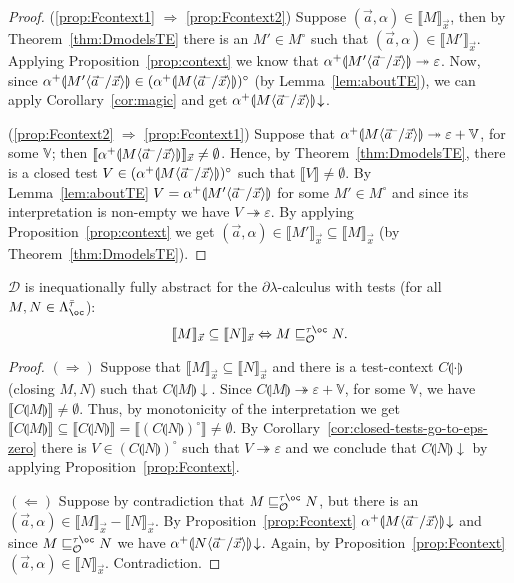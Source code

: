 \documentclass{LMCS}
\newcommand{\bool}{\mathbf{2}}
\newcommand{\dlam}{\ensuremath{\partial\lambda}}
\newcommand{\bang}{\oc}
\renewcommand{\hole}[1]{\llparenthesis #1\rrparenthesis}
\newcommand{\FSet}[1]{\Lambda^{#1}_{\bang}}
\newcommand{\msto}{\twoheadrightarrow}
\newcommand{\Fobsle}{\sqsubseteq^{\gt\bang}_{\mathcal{O}}}
\newcommand{\TE}[1]{#1^{\circ}} \newcommand{\at}{\!::\!}
\newcommand{\Int}[1]{\llbracket #1\rrbracket} \newcommand{\trm}[1]{#1^{\textrm{--}}}
\newcommand{\cont}[2]{#1^{+}\hole{#2}}
\renewcommand{\iff}{\Leftrightarrow}
\newcommand{\seq}[1]{\vec{#1}}
\newcommand{\imp}{\Rightarrow}
\newcommand{\sV}{\mathbb{V}}
\newcommand{\ga}{\alpha}
\newcommand{\gt}{\ensuremath{\tau}}
\newcommand{\gto}{\ensuremath{\bar\tau}}
\newcommand{\cD}{\mathcal{D}}
\newcommand{\cOnv}[1]{#1\!\downarrow} \renewcommand{\div}[1]{#1\!\uparrow} \newcommand{\module}[1]{\bool\langle #1 \rangle}
\begin{document}
\begin{proof}
(\ref{prop:Fcontext1} $\imp$ \ref{prop:Fcontext2})
Suppose $(\seq a,\alpha)\in\Int{M}_{\seq x}$, then by Theorem~\ref{thm:DmodelsTE} 
there is an $M'\in\TE{M}$ such that $(\seq a,\alpha)\in\Int{M'}_{\seq x}$.
Applying Proposition~\ref{prop:context} we know that $\cont{\alpha}{M'\lsubst{\seq x}{\trm{\seq{a}}}}\msto\varepsilon$.
Now, since $\cont{\alpha}{M'\lsubst{\seq x}{\trm{\seq{a}}}}\in\TE{(\cont{\alpha}{M\lsubst{\seq x}{\trm{\seq{a}}}})}$ (by Lemma~\ref{lem:aboutTE}),
we can apply Corollary~\ref{cor:magic} and get $\cOnv{\cont{\alpha}{M\lsubst{\seq x}{\trm{\seq{a}}}}}$.

(\ref{prop:Fcontext2} $\imp$ \ref{prop:Fcontext1}) 
Suppose that $\cont{\alpha}{M\lsubst{\seq{x}}{\trm{\seq{a}}}} \msto \varepsilon + \sV$, for some $\sV$; 
then $\Int{\cont{\alpha}{M\lsubst{\seq{x}}{\trm{\seq{a}}}}}_{\seq x}\neq\emptyset$.
Hence, by Theorem~\ref{thm:DmodelsTE}, there is a closed test $V\in\TE{(\cont{\alpha}{M\lsubst{\seq{x}}{\trm{\seq{a}}}})}$ 
such that $\Int{V}\neq\emptyset$.
By Lemma~\ref{lem:aboutTE} $V = \cont{\alpha}{M'\lsubst{\seq x}{\trm{\seq{a}}}}$ for some $M'\in\TE{M}$ and
since its interpretation is non-empty we have $V\msto\varepsilon$.
By applying Proposition~\ref{prop:context} we get $(\seq a,\alpha)\in\Int{M'}_{\seq x}\subseteq\Int{M}_{\seq x}$ 
(by Theorem~\ref{thm:DmodelsTE}).
\end{proof}

\begin{thm}\label{thm:main2} 
$\cD$ is inequationally fully abstract for the \dlam-calculus with tests (for all $M,N\in\FSet{\gto}$):
$$
\Int{M}_{\seq x}\subseteq \Int{N}_{\seq x} \iff M\Fobsle N.
$$
\end{thm}

\begin{proof} $(\imp)$ Suppose that $\Int{M}_{\seq x}\subseteq\Int{N}_{\seq x}$ 
and there is a test-context $C\hole{\cdot}$ (closing $M,N$) such that $\cOnv{C\hole{M}}$.
Since $C\hole{M}\msto\varepsilon + \sV$, for some $\sV$, we have $\Int{C\hole{M}}\neq\emptyset$.
Thus, by monotonicity of the interpretation we get 
$\Int{C\hole{M}}\subseteq\Int{C\hole{N}} = \Int{\TE{(C\hole{N})}}\neq\emptyset$.
By Corollary~\ref{cor:closed-tests-go-to-eps-zero} there is $V\in\TE{(C\hole{N})}$ such that $V\msto\varepsilon$ and we conclude 
that $\cOnv{C\hole{N}}$ by applying Proposition~\ref{prop:Fcontext}.

$(\Leftarrow)$ Suppose by contradiction that $M\Fobsle N$, but there is an $(\seq a,\alpha)\in\Int{M}_{\seq x} - \Int{N}_{\seq x}$.
By Proposition~\ref{prop:Fcontext} $\cOnv{\cont{\ga}{M\lsubst{\seq{x}}{\trm{\seq{a}}}}}$ and since $M\Fobsle N$ we 
have $\cOnv{\cont{\ga}{N\lsubst{\seq{x}}{\trm{\seq{a}}}}}$. 
Again, by Proposition~\ref{prop:Fcontext} $(\seq a,\alpha)\in\Int{N}_{\seq x}$. Contradiction.
\end{proof}
\end{document}
